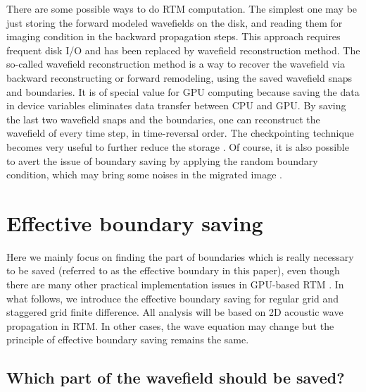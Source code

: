 There are some possible ways to do RTM computation. The simplest one may be just storing the forward modeled wavefields on the disk, and reading them for imaging condition in the backward propagation steps. This approach requires frequent disk I/O and has been replaced by wavefield reconstruction method. The so-called wavefield reconstruction method is a way to recover the wavefield via backward reconstructing or forward remodeling, using the saved wavefield snaps and boundaries. It is of special value for GPU computing because saving the data in device variables eliminates data transfer between CPU and GPU. By saving the last two wavefield snaps and the boundaries, one can reconstruct the wavefield of every time step, in time-reversal order. The checkpointing technique becomes very useful to further reduce the storage \citep{symes2007reverse,dussaud2008computational}. Of course, it is also possible to avert the issue of boundary saving by applying the random boundary condition, which may bring some noises in the migrated image \citep{clapp2009reverse,clapp2010selecting,liu2013wavefield,liu20133d}.


\section{Effective boundary saving}

Here we mainly focus on finding the part of boundaries which is really necessary to be saved (referred to as the effective boundary in this paper), even though there are many other practical implementation issues in GPU-based RTM \citep{liu2012issues}.  In what follows, we introduce the effective boundary saving for regular grid and staggered grid finite difference. All analysis will be based on 2D acoustic wave propagation in RTM. In other cases, the wave equation may change but the principle of effective boundary saving remains the same.

\subsection{Which part of the wavefield should be saved?}

